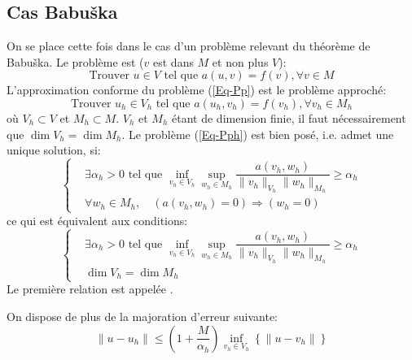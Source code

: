 \subsection{Cas Babuška}
On se place cette fois dans le cas d'un problème relevant du théorème de Babuška.
Le problème est ($v$ est dans $M$ et non plus $V$):
\begin{equation}\label{Eq-Pp}
\text{Trouver } u\in V \text{ tel que } a(u,v) = f(v), \forall v\in M
\end{equation}
L'approximation conforme du problème (\ref{Eq-Pp}) est le problème approché:
\begin{equation}\label{Eq-Pph}
\text{Trouver } u_h\in V_h \text{ tel que } a(u_h,v_h) = f(v_h), \forall v_h\in M_h
\end{equation}
où $V_h\subset V$ et $M_h\subset M$.
\medskip
{}
$V_h$ et $M_h$ étant de dimension finie, il faut nécessairement que $\dim V_h=\dim M_h$.
\medskip
Le problème (\ref{Eq-Pph}) est bien posé, i.e. admet une unique solution, si:
\begin{equation}\left\{
\begin{aligned}
&\displaystyle\exists\alpha_h>0 \text{ tel que } \inf_{v_h\in V_h}\sup_{w_h\in M_h}\dfrac{a(v_h,w_h)}{\|v_h\|_{V_h}\|w_h\|_{M_h}}\ge\alpha_h\\
&\forall w_h\in M_h,\quad \left(a(v_h,w_h)=0\right)\Rightarrow(w_h=0)
\end{aligned}
\right.\end{equation}
ce qui est équivalent aux conditions:
\begin{equation}\left\{
\begin{aligned}
&\displaystyle\exists\alpha_h>0 \text{ tel que } \inf_{v_h\in V_h}\sup_{w_h\in M_h}\dfrac{a(v_h,w_h)}{\|v_h\|_{V_h}\|w_h\|_{M_h}}\ge\alpha_h\\
&\dim V_h=\dim M_h
\end{aligned}
\right.\end{equation}
Le première relation est appelée .


\medskip
On dispose de plus de la majoration d'erreur suivante:
\begin{equation}
\|u-u_h\| \le \left(1+\dfrac{M}{\alpha_h}\right) \inf_{v_h\in V_h} \left\{\|u-v_h\|\right\}
\end{equation}
\medskip
